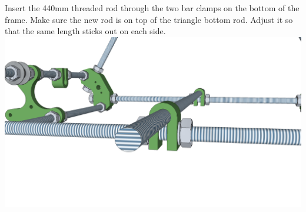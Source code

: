 \documentclass[twoside,a4paper,titlepage]{memoir}
\begin{document}
	\section{}
	Insert the 440mm threaded rod through the two bar clamps on the bottom of the frame. Make sure the
	new rod is on top of the triangle bottom rod. Adjust it so that the same length sticks out on each side.\\
	\includegraphics[width=1\linewidth]{graphics/ch5_5.png}
	
\end{document}

